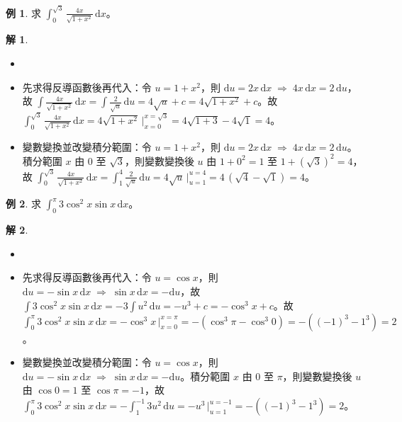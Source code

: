 \documentclass[12pt]{extarticle}
\newcommand{\ds}{\displaystyle}
\newcommand{\ie}{\;\Longrightarrow\;}
\theoremstyle{definition}
\newtheorem*{ex}{例}
\newtheorem*{sol}{解}
\begin{document}
\begin{ex}
  求 $\ds\int_0^{\sqrt{3}}\frac{4x}{\sqrt{1 + x^2}}\,\text{d}x$。
\end{ex}

\begin{sol}
  \begin{itemize}\setlength\itemsep{0em}
    \item[]
    \item 先求得反導函數後再代入：令 $\ds u = 1 + x^2$，則 $\ds\text{d}u = 2 x\,\text{d}x\ie 4x\,\text{d}x = 2\,\text{d}u$，故 $\ds\int\frac{4x}{\sqrt{1 + x^2}}\,\text{d}x = \int\frac{2}{\sqrt{u}}\,\text{d}u = 4\sqrt{u} + c = 4\sqrt{1 + x^2} + c$。故 $\ds\int_0^{\sqrt{3}}\frac{4x}{\sqrt{1 + x^2}}\,\text{d}x = 4\sqrt{1 + x^2}\,\Big|_{x = 0}^{x = \sqrt{3}} = 4\sqrt{1 + 3} - 4\sqrt{1} = 4$。
    \item 變數變換並改變積分範圍：令 $\ds u = 1 + x^2$，則 $\ds\text{d}u = 2 x\,\text{d}x\ie 4x\,\text{d}x = 2\,\text{d}u$。積分範圍 $x$ 由 $0$ 至 $\sqrt{3}$，則變數變換後 $u$ 由 $\ds1 + 0^2 = 1$ 至 $\ds1 + (\sqrt{3})^2 = 4$，故 $\ds\int_0^{\sqrt{3}}\frac{4x}{\sqrt{1 + x^2}}\,\text{d}x = \int_1^4 \frac{2}{\sqrt{u}}\,\text{d}u = 4\sqrt{u}\,\Big|_{u = 1}^{u = 4} = 4\,(\sqrt{4} - \sqrt{1}) = 4$。
  \end{itemize}
\end{sol}

\begin{ex}
  求 $\ds\int_0^{\pi}3\cos^2 x\sin x\,\text{d}x$。
\end{ex}

\begin{sol}
  \begin{itemize}\setlength\itemsep{0em}
    \item[]
    \item 先求得反導函數後再代入：令 $\ds u = \cos x$，則 $\ds\text{d}u = -\sin x\,\text{d}x\ie \sin x\,\text{d}x = -\text{d}u$，故 $\ds\int3\cos^2 x\sin x\,\text{d}x = -3\int u^2\,\text{d}u = -u^3 + c = -\cos^3 x + c$。故 $\ds\int_0^{\pi}3\cos^2 x\sin x\,\text{d}x = -\cos^3 x\,\Big|_{x = 0}^{x = \pi} = -(\cos^3\pi - \cos^3 0) = -((-1)^3 - 1^3) = 2$。
    \item 變數變換並改變積分範圍：令 $\ds u = \cos x$，則 $\ds\text{d}u = -\sin x\,\text{d}x\ie \sin x\,\text{d}x = -\text{d}u$。積分範圍 $x$ 由 $0$ 至 $\pi$，則變數變換後 $u$ 由 $\ds\cos 0 = 1$ 至 $\ds\cos\pi= -1$，故 $\ds\int_0^{\pi}3\cos^2 x\sin x\,\text{d}x = -\int_{1}^{-1}3u^2\,\text{d}u = -u^3\,\Big|_{u = 1}^{u = -1} = -((-1)^3 - 1^3) = 2$。
  \end{itemize}
\end{sol}
\end{document}
